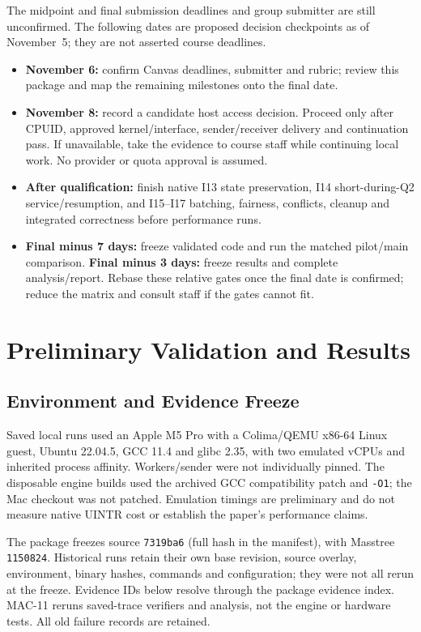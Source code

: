 \documentclass[sigconf,nonacm]{acmart}
\begin{document}
The midpoint and final submission deadlines and group submitter are still
unconfirmed. The following dates are proposed decision checkpoints as of
November~5; they are not asserted course deadlines.
\begin{itemize}\itemsep0pt
\item \textbf{November 6:} confirm Canvas deadlines, submitter and rubric;
  review this package and map the remaining milestones onto the final date.
\item \textbf{November 8:} record a candidate host access decision. Proceed
  only after CPUID, approved kernel/interface, sender/receiver delivery and
  continuation pass. If unavailable, take the evidence to course staff while
  continuing local work. No provider or quota approval is assumed.
\item \textbf{After qualification:} finish native I13 state preservation,
  I14 short-during-Q2 service/resumption, and I15--I17 batching, fairness,
  conflicts, cleanup and integrated correctness before performance runs.
\item \textbf{Final minus 7 days:} freeze validated code and run the matched
  pilot/main comparison. \textbf{Final minus 3 days:} freeze results and
  complete analysis/report. Rebase these relative gates once the final date
  is confirmed; reduce the matrix and consult staff if the gates cannot fit.
\end{itemize}

\section{Preliminary Validation and Results}
\subsection{Environment and Evidence Freeze}
Saved local runs used an Apple M5 Pro with a Colima/QEMU x86-64 Linux guest,
Ubuntu 22.04.5, GCC 11.4 and glibc 2.35, with two emulated vCPUs and inherited
process affinity. Workers/sender were not individually pinned. The disposable
engine builds used the archived GCC compatibility patch and \texttt{-O1};
the Mac checkout was not patched. Emulation timings are preliminary and do
not measure native UINTR cost or establish the paper's performance claims.

The package freezes source \texttt{7319ba6} (full hash in the manifest), with
Masstree \texttt{1150824}. Historical runs retain their own base revision,
source overlay, environment, binary hashes, commands and configuration;
they were not all rerun at the freeze. Evidence IDs below resolve through the
package evidence index. MAC-11 reruns saved-trace verifiers and analysis,
not the engine or hardware tests. All old failure records are retained.
\end{document}
